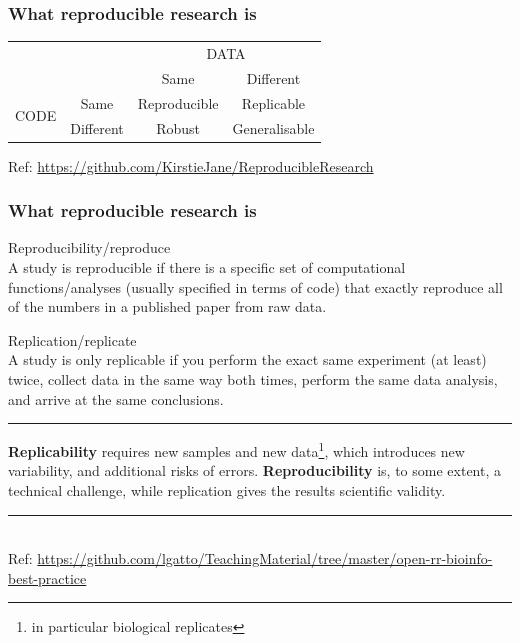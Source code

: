 \documentclass{beamer}
\begin{document}
\begin{frame}
\frametitle{What reproducible research is}
\begin{table}[]
\centering
\begin{tabular}{cccc}
                                           &                                & \multicolumn{2}{c}{DATA}                          \\ \cline{3-4}
                                           & \multicolumn{1}{c|}{}          & Same         & \multicolumn{1}{c|}{Different}     \\ \cline{2-4}
\multicolumn{1}{c|}{\multirow{2}{*}{CODE}} & \multicolumn{1}{c|}{Same}      & Reproducible & \multicolumn{1}{c|}{Replicable}    \\
\multicolumn{1}{c|}{}                      & \multicolumn{1}{c|}{Different} & Robust       & \multicolumn{1}{c|}{Generalisable} \\ \cline{2-4}
\end{tabular}
\end{table}
\vspace{3px}
\tiny Ref: {\url{https://github.com/KirstieJane/ReproducibleResearch}}
\end{frame}


\begin{frame}
\frametitle{What reproducible research is}

\Large{Reproducibility/reproduce}\\ \footnotesize A study is reproducible if there is a specific set of computational functions/analyses (usually specified in terms of code) that exactly reproduce all of the numbers in a published paper from raw data.

\Large{Replication/replicate}\\ \footnotesize A study is only replicable if you perform the exact same experiment (at least) twice, collect data in the same way both times, perform the same data analysis, and arrive at the same conclusions.
\rule{\textwidth}{0.05pt}
{\bf Replicability} requires new samples and new data\footnote{\tiny{in particular biological replicates}}, which introduces new variability, and additional risks of errors. {\bf Reproducibility} is, to some extent, a technical challenge, while replication gives the results scientific validity.
\rule{\textwidth}{0.05pt}\\
\vspace{3px}
\tiny Ref: {\url{https://github.com/lgatto/TeachingMaterial/tree/master/open-rr-bioinfo-best-practice}}
\end{frame}
\end{document}

